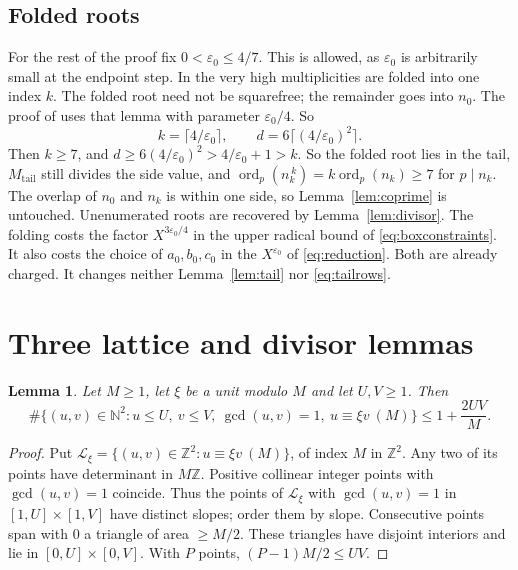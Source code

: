 \documentclass{amsart}
\newtheorem{lemma}{Lemma}[section]
\theoremstyle{definition}
\theoremstyle{plain}
\numberwithin{equation}{section}
\numberwithin{table}{section}
\newcommand{\Z}{\mathbb{Z}}
\newcommand{\N}{\mathbb{N}}
\begin{document}
\subsection{Folded roots}\label{sec:fold}
For the rest of the proof fix $0<\varepsilon_0\le4/7$. This is allowed, as
$\varepsilon_0$ is arbitrarily small at the endpoint step.
In \cite[Lemma~2.2]{BBLT} the very high multiplicities are folded into one
index $k$. The folded root need not be squarefree; the remainder goes into
$n_0$. The proof of \cite[Proposition~2.1]{BBLT} uses that lemma with
parameter $\varepsilon_0/4$. So
\[
 k=\lceil4/\varepsilon_0\rceil,\qquad d=6\lceil(4/\varepsilon_0)^{2}\rceil .
\]
Then $k\ge7$, and
$d\ge6(4/\varepsilon_0)^2>4/\varepsilon_0+1>k$. So the folded root lies in the
tail, $M_{\mathrm{tail}}$ still divides the side value, and
$\operatorname{ord}_p(n_k^{\,k})=k\operatorname{ord}_p(n_k)\ge7$ for
$p\mid n_k$. The overlap of $n_0$ and $n_k$ is within one side, so
Lemma~\ref{lem:coprime} is untouched. Unenumerated roots are recovered by
Lemma~\ref{lem:divisor}. The folding costs the factor
$X^{3\varepsilon_0/4}$ in the upper radical bound of \eqref{eq:boxconstraints}.
It also costs the choice of $a_0,b_0,c_0$ in the $X^{\varepsilon_0}$ of
\eqref{eq:reduction}. Both are already charged. It changes neither
Lemma~\ref{lem:tail} nor \eqref{eq:tailrows}.




\section{Three lattice and divisor lemmas}\label{sec:lat}

\begin{lemma}\label{lem:farey}
Let $M\ge1$, let $\xi$ be a unit modulo $M$ and let $U,V\ge1$. Then
\begin{equation}\label{eq:farey}
 \#\{(u,v)\in\N^2:u\le U,\ v\le V,\ \gcd(u,v)=1,\ u\equiv\xi v\ (M)\}
 \le1+\frac{2UV}{M}.
\end{equation}
\end{lemma}

\begin{proof}
Put $\mathcal L_\xi=\{(u,v)\in\Z^2:u\equiv\xi v\ (M)\}$, of index $M$ in
$\Z^2$. Any two of its points have determinant in $M\Z$. Positive collinear
integer points with $\gcd(u,v)=1$ coincide. Thus the points of $\mathcal L_\xi$
with $\gcd(u,v)=1$ in $[1,U]\times[1,V]$ have distinct slopes; order them by
slope. Consecutive
points span with $0$ a triangle of area $\ge M/2$. These triangles have
disjoint interiors and lie in $[0,U]\times[0,V]$. With $P$ points,
$(P-1)M/2\le UV$.
\end{proof}
\end{document}
